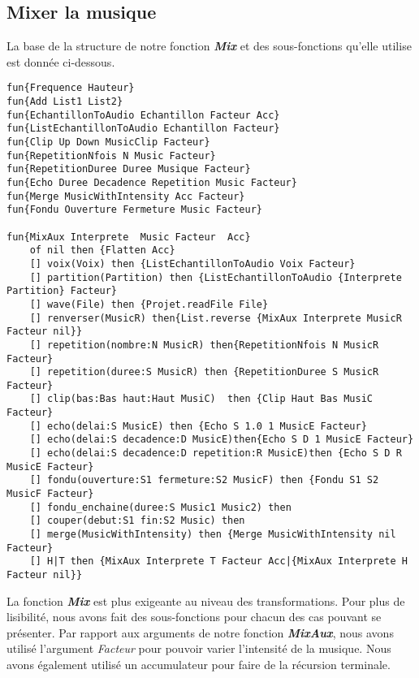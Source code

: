 \documentclass[a4paper,12pt]{report}
\begin{document}
\newpage
\subsection*{Mixer la musique}
La base de la structure de notre fonction \textit{\textbf{Mix}} et des sous-fonctions qu'elle utilise est donnée ci-dessous.

\begin{lstlisting}[frame=single] 
fun{Frequence Hauteur}
fun{Add List1 List2}
fun{EchantillonToAudio Echantillon Facteur Acc}
fun{ListEchantillonToAudio Echantillon Facteur}
fun{Clip Up Down MusicClip Facteur}
fun{RepetitionNfois N Music Facteur}
fun{RepetitionDuree Duree Musique Facteur}
fun{Echo Duree Decadence Repetition Music Facteur}
fun{Merge MusicWithIntensity Acc Facteur}
fun{Fondu Ouverture Fermeture Music Facteur}

fun{MixAux Interprete  Music Facteur  Acc}
	of nil then {Flatten Acc}
	[] voix(Voix) then {ListEchantillonToAudio Voix Facteur}
	[] partition(Partition) then {ListEchantillonToAudio {Interprete Partition} Facteur}
	[] wave(File) then {Projet.readFile File}
	[] renverser(MusicR) then{List.reverse {MixAux Interprete MusicR Facteur nil}}
	[] repetition(nombre:N MusicR) then{RepetitionNfois N MusicR Facteur}
	[] repetition(duree:S MusicR) then {RepetitionDuree S MusicR Facteur}
	[] clip(bas:Bas haut:Haut MusiC)  then {Clip Haut Bas MusiC Facteur}
	[] echo(delai:S MusicE) then {Echo S 1.0 1 MusicE Facteur}
	[] echo(delai:S decadence:D MusicE)then{Echo S D 1 MusicE Facteur}
	[] echo(delai:S decadence:D repetition:R MusicE)then {Echo S D R MusicE Facteur}
	[] fondu(ouverture:S1 fermeture:S2 MusicF) then {Fondu S1 S2 MusicF Facteur}
	[] fondu_enchaine(duree:S Music1 Music2) then
	[] couper(debut:S1 fin:S2 Music) then
	[] merge(MusicWithIntensity) then {Merge MusicWithIntensity nil Facteur}
	[] H|T then {MixAux Interprete T Facteur Acc|{MixAux Interprete H Facteur nil}}
\end{lstlisting}
La fonction \textit{\textbf{Mix}} est plus exigeante au niveau des transformations. Pour plus de lisibilité, nous avons fait des sous-fonctions pour chacun des cas pouvant se présenter. 
Par rapport aux arguments de notre fonction \textit{\textbf{MixAux}}, nous avons utilisé l'argument \textit{Facteur} pour pouvoir varier l'intensité de la musique. Nous avons également utilisé un accumulateur pour faire de la récursion terminale.
\end{document}
